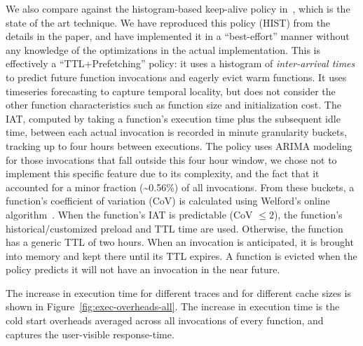 We also compare against the histogram-based keep-alive policy in~\cite{shahrad_serverless_2020}, which is the state of the art technique.
We have reproduced this policy (HIST) from the details in the paper, and have implemented it in a ``best-effort'' manner without any knowledge of the optimizations in the actual implementation.
This is effectively a ``TTL+Prefetching'' policy: it uses a histogram of \emph{inter-arrival times} to predict future function invocations and eagerly evict warm functions.
It uses timeseries forecasting to capture temporal locality, but does not consider the other function characteristics such as function size and initialization cost. 
The IAT, computed by taking a function's execution time plus the subsequent idle time, between each actual invocation is recorded in minute granularity buckets, tracking up to four hours between executions.
The policy uses ARIMA modeling for those invocations that fall outside this four hour window, we chose not to implement this specific feature due to its complexity, and the fact that it accounted for a minor fraction (\textasciitilde 0.56\%) of all invocations.
From these buckets, a function's coefficient of variation (CoV) is calculated using Welford's online algorithm~\cite{welford}. 
When the function's IAT is predictable (CoV $\leq 2$), the function's historical/customized preload and TTL time are used.
Otherwise, the function has a generic TTL of two hours. 
When an invocation is anticipated, it is brought into memory and kept there until its TTL expires.
A function is evicted when the policy predicts it will not have an invocation in the near future. 


%
The increase in execution time for different traces and for different cache sizes is shown in Figure~\ref{fig:exec-overheads-all}.
The increase in execution time is the cold start overheads averaged across all invocations of every function, and captures the user-visible response-time. 
%

